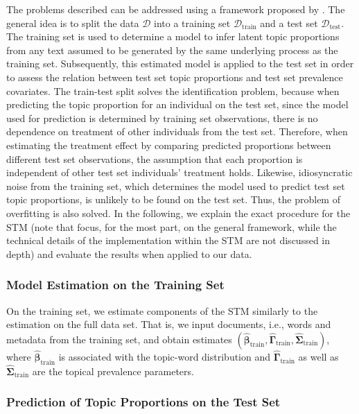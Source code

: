 The problems described can be addressed using a framework proposed by \cite{egami2018make}. The general idea is to split the data $\mathcal{D}$ into a training set $\mathcal{D}_{\text{train}}$ and a test set $\mathcal{D}_{\text{test}}$. The training set is used to determine a model to infer latent topic proportions from any text assumed to be generated by the same underlying process as the training set. Subsequently, this estimated model is applied to the test set in order to assess the relation between test set topic proportions and test set prevalence covariates. The train-test split solves the identification problem, because when predicting the topic proportion for an individual on the test set, since the model used for prediction is determined by training set observations, there is no dependence on treatment of other individuals from the test set. Therefore, when estimating the treatment effect by comparing predicted proportions between different test set observations, the assumption that each proportion is independent of other test set individuals' treatment holds. Likewise, idiosyncratic noise from the training set, which determines the model used to predict test set topic proportions, is unlikely to be found on the test set. Thus, the problem of overfitting is also solved. In the following, we explain the exact procedure for the STM (note that \cite{egami2018make} focus, for the most part, on the general framework, while the technical details of the implementation within the STM are not discussed in depth) and evaluate the results when applied to our data.

\subsubsection{Model Estimation on the Training Set}
\label{Model Estimation on the Training Set}

On the training set, we estimate components of the STM similarly to the estimation on the full data set. That is, we input documents, i.e., words and metadata from the training set, and obtain estimates $(\hat{\boldsymbol{\beta}}_{\text{train}}, \hat{\boldsymbol{\Gamma}}_{\text{train}}, \hat{\boldsymbol{\Sigma}}_{\text{train}})$, where $\hat{\boldsymbol{\beta}}_{\text{train}}$ is associated with the topic-word distribution and $\hat{\boldsymbol{\Gamma}}_{\text{train}}$ as well as $\hat{\boldsymbol{\Sigma}}_{\text{train}}$ are the topical prevalence parameters. 

\subsubsection{Prediction of Topic Proportions on the Test Set}
\label{Prediction of Topic Proportions on the Test Set}

